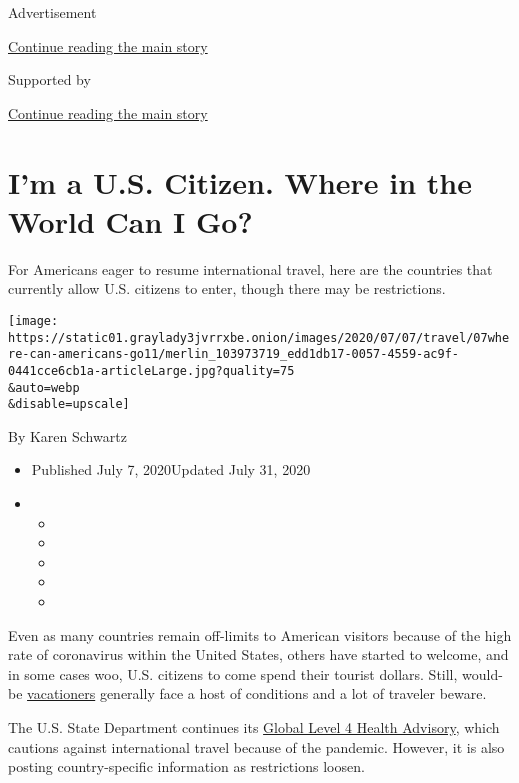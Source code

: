 Advertisement

\protect\hyperlink{after-top}{Continue reading the main story}

Supported by

\protect\hyperlink{after-sponsor}{Continue reading the main story}

\hypertarget{im-a-us-citizen-where-in-the-world-can-i-go}{%
\section{I'm a U.S. Citizen. Where in the World Can I
Go?}\label{im-a-us-citizen-where-in-the-world-can-i-go}}

For Americans eager to resume international travel, here are the
countries that currently allow U.S. citizens to enter, though there may
be restrictions.

\texttt{[image: https://static01.graylady3jvrrxbe.onion/images/2020/07/07/travel/07where-can-americans-go11/merlin\_103973719\_edd1db17-0057-4559-ac9f-0441cce6cb1a-articleLarge.jpg?quality=75\\\&auto=webp\\\&disable=upscale]}

By Karen Schwartz

\begin{itemize}
\item
  Published July 7, 2020Updated July 31, 2020
\item
  \begin{itemize}
  \item
  \item
  \item
  \item
  \item
  \end{itemize}
\end{itemize}

Even as many countries remain off-limits to American visitors because of
the high rate of coronavirus within the United States, others have
started to welcome, and in some cases woo, U.S. citizens to come spend
their tourist dollars. Still, would-be
\href{https://www.nytimes3xbfgragh.onion/2020/07/16/travel/virus-vacation.html}{vacationers}
generally face a host of conditions and a lot of traveler beware.

The U.S. State Department continues its
\href{https://travel.state.gov/content/travel/en/traveladvisories/COVID-19-Country-Specific-Information.html}{Global
Level 4 Health Advisory}, which cautions against international travel
because of the pandemic. However, it is also posting country-specific
information as restrictions loosen.

